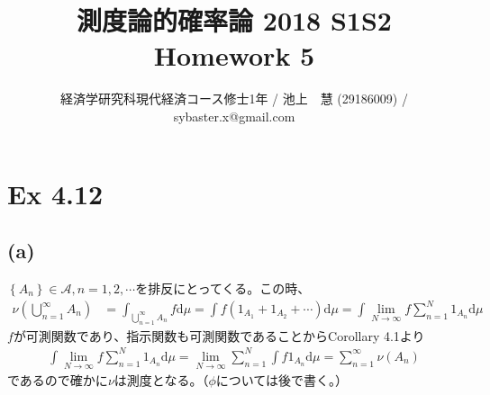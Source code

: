 \documentclass{article}
\begin{document}
\title{測度論的確率論 2018 S1S2 \\ 
Homework 5}
\author{経済学研究科現代経済コース修士1年 / 池上　慧 (29186009) / sybaster.x@gmail.com}
\maketitle

\section{Ex 4.12}
\subsection{(a)}
$\left\{ A_n \right\} \in \mathcal{A}, n = 1,2, \cdots$を排反にとってくる。この時、
\begin{align*}
	\nu \left( \bigcup_{n = 1}^{\infty} A_n \right) &= \int_{\bigcup_{n = 1}^{\infty} A_n} f \mathrm{d}\mu = \int f \left( 1_{A_1} + 1_{A_2} + \cdots \right) \mathrm{d}\mu = \int \lim_{N \to \infty} f \sum_{n = 1}^N 1_{A_n} \mathrm{d}\mu 
\end{align*}
$f$が可測関数であり、指示関数も可測関数であることからCorollary 4.1より
\begin{align*}
	 \int \lim_{N \to \infty} f \sum_{n = 1}^N 1_{A_n} \mathrm{d}\mu = \lim_{N \to \infty} \sum_{n = 1}^N \int f 1_{A_n}\mathrm{d}\mu = \sum_{n = 1}^{\infty} \nu(A_n)
\end{align*}
であるので確かに$\nu$は測度となる。（$\phi$については後で書く。）
\end{document}
